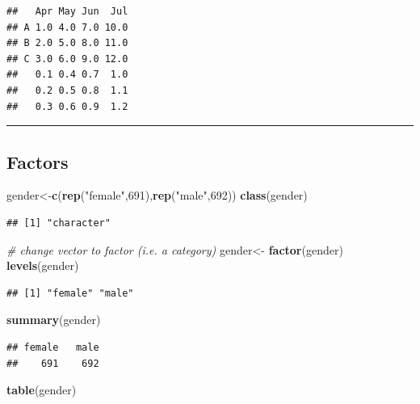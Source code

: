 \documentclass[]{article}
\newenvironment{Shaded}{\begin{snugshade}}{\end{snugshade}}
\newcommand{\KeywordTok}[1]{\textcolor[rgb]{0.13,0.29,0.53}{\textbf{{#1}}}}
\newcommand{\DecValTok}[1]{\textcolor[rgb]{0.00,0.00,0.81}{{#1}}}
\newcommand{\StringTok}[1]{\textcolor[rgb]{0.31,0.60,0.02}{{#1}}}
\newcommand{\CommentTok}[1]{\textcolor[rgb]{0.56,0.35,0.01}{\textit{{#1}}}}
\newcommand{\NormalTok}[1]{{#1}}
\numberwithin{equation}{section}
\begin{document}
\begin{verbatim}
##   Apr May Jun  Jul
## A 1.0 4.0 7.0 10.0
## B 2.0 5.0 8.0 11.0
## C 3.0 6.0 9.0 12.0
##   0.1 0.4 0.7  1.0
##   0.2 0.5 0.8  1.1
##   0.3 0.6 0.9  1.2
\end{verbatim}

\begin{center}\rule{0.5\linewidth}{\linethickness}\end{center}

\subsection{Factors}\label{factors}

\begin{Shaded}
\begin{Highlighting}[]
\NormalTok{gender<-}\KeywordTok{c}\NormalTok{(}\KeywordTok{rep}\NormalTok{(}\StringTok{"female"}\NormalTok{,}\DecValTok{691}\NormalTok{),}\KeywordTok{rep}\NormalTok{(}\StringTok{"male"}\NormalTok{,}\DecValTok{692}\NormalTok{))}
\KeywordTok{class}\NormalTok{(gender)}
\end{Highlighting}
\end{Shaded}

\begin{verbatim}
## [1] "character"
\end{verbatim}

\begin{Shaded}
\begin{Highlighting}[]
\CommentTok{# change vector to factor (i.e. a category)}
\NormalTok{gender<-}\StringTok{ }\KeywordTok{factor}\NormalTok{(gender)}
\KeywordTok{levels}\NormalTok{(gender)}
\end{Highlighting}
\end{Shaded}

\begin{verbatim}
## [1] "female" "male"
\end{verbatim}

\begin{Shaded}
\begin{Highlighting}[]
\KeywordTok{summary}\NormalTok{(gender)}
\end{Highlighting}
\end{Shaded}

\begin{verbatim}
## female   male 
##    691    692
\end{verbatim}

\begin{Shaded}
\begin{Highlighting}[]
\KeywordTok{table}\NormalTok{(gender)}
\end{Highlighting}
\end{Shaded}
\end{document}
